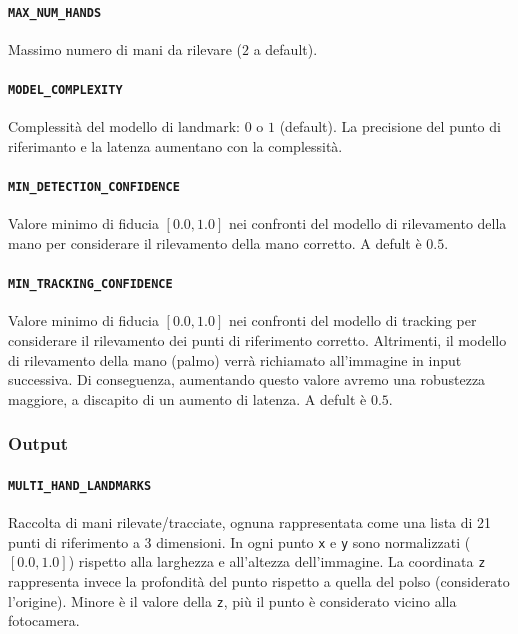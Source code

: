 \paragraph{\texttt{MAX\_NUM\_HANDS}} Massimo numero di mani da rilevare ($2$ a default).

\paragraph{\texttt{MODEL\_COMPLEXITY}} Complessità del modello di landmark: $0$ o $1$ (default). La precisione del punto di riferimanto e la latenza aumentano con la complessità.

\paragraph{\texttt{MIN\_DETECTION\_CONFIDENCE}} Valore minimo di fiducia $[0.0, 1.0]$ nei confronti del modello di rilevamento della mano per considerare il rilevamento della mano corretto. A defult è $0.5$.

\paragraph{\texttt{MIN\_TRACKING\_CONFIDENCE}} Valore minimo di fiducia $[0.0, 1.0]$ nei confronti del modello di tracking per considerare il rilevamento dei punti di riferimento corretto. Altrimenti, il modello di rilevamento della mano (palmo) verrà richiamato all'immagine in input successiva. Di conseguenza, aumentando questo valore avremo una robustezza maggiore, a discapito di un aumento di latenza. A defult è $0.5$.

\newpage
\subsubsection{Output}

\paragraph{\texttt{MULTI\_HAND\_LANDMARKS}} Raccolta di mani rilevate/tracciate, ognuna rappresentata come una lista di 21 punti di riferimento a 3 dimensioni. In ogni punto \texttt{x} e \texttt{y} sono normalizzati ($[0.0, 1.0]$) rispetto alla larghezza e all'altezza dell'immagine. La coordinata \texttt{z} rappresenta invece la profondità del punto rispetto a quella del polso (considerato l'origine). Minore è il valore della \texttt{z}, più il punto è considerato vicino alla fotocamera.


